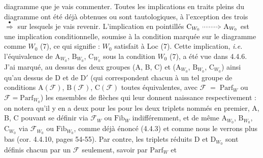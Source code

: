 \documentclass[11pt]{article}
\newcommand{\msp}[1]{\marginpar{\footnotesize [#1]}}
\newcommand{\cF}{\mathcal{F}}
\newcommand{\Fib}{\mathrm{Fib}}
\newcommand{\Parf}{\mathrm{Parf}}
\newcommand{\dottedimplies}{\mathrel{\tikz[baseline=-0.6ex]{\draw[dotted, double, double distance=1.5pt, -{Implies}] (0,0) -- (0.9,0);}}}
\begin{document}
diagramme que je vais commenter. Toutes les implications en traits pleins du diagramme ont été déjà obtenues ou sont tautologiques, à l'exception des trois $\overset{\bullet}{\Longrightarrow}$ sur lesquels je vais revenir. L'implication en pointillés $\mathrm{C}_{W_0} \dottedimplies \mathrm{A}_{W_0}$ est une implication conditionnelle, soumise à la condition marquée sur le diagramme comme $W_0$ (7), ce qui signifie : $W_0$ satisfait à Loc (7). Cette implication, \textit{i.e.} l'équivalence de $\mathrm{A}_{W_0}$, $\mathrm{B}_{W_0}$, $\mathrm{C}_{W_0}$ sous la condition $W_0$ (7), a été vue dans 4.4.6. J'ai marqué, au dessus des deux groupes (A, B, C) et ($\mathrm{A}_{W_0}$, $\mathrm{B}_{W_0}$, $\mathrm{C}_{W_0}$) ainsi qu'au dessus de D et de D$'$ (qui correspondent chacun à un tel groupe de conditions $\mathrm{A}(\cF)$, $\mathrm{B}(\cF)$, $\mathrm{C}(\cF)$ toutes équivalentes, avec $\cF \;=\; \Parf_W$ ou $\cF = \Parf_{W_0}$) les
\msp{page 49}
ensembles de flèches qui leur donnent naissance respectivement : on notera qu'il y en a deux pour les pour les deux triplets nommés en premier, A, B, C pouvant se définir via $\cF_W$ ou $\Fib_W$ indifféremment, et de même $\mathrm{A}_{W_0}$, $\mathrm{B}_{W_0}$, $\mathrm{C}_{W_0}$ via $\cF_{W_0}$ ou $\Fib_{W_0}$, comme déjà énoncé (4.4.3) et comme nous le verrons plus bas (cor. 4.4.10, pages 54-55). Par contre, les triplets réduits D et $\mathrm{D}_{W_0}$ sont définis chacun par un $\cF$ seulement, savoir par $\Parf_W$ et %
\end{document}
